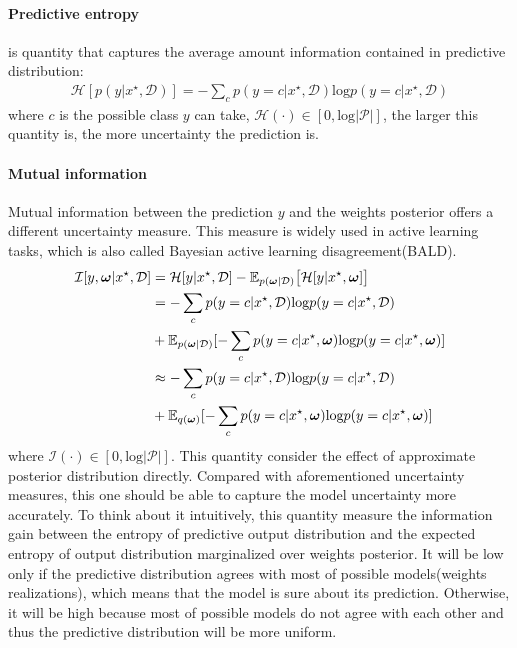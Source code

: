 \paragraph{Predictive entropy} is quantity that captures the average amount information contained in predictive distribution\cite{shannon1948mathematical}: 
\begin{equation}\label{entropy}	
\begin{aligned}
\mathcal H[p(y|x^\star, \mathcal D)] = -\sum_{c}p(y=c|x^\star, \mathcal D)\text{log}p(y=c|x^\star, \mathcal D)
\end{aligned}
\end{equation}
where $c$ is the possible class $y$ can take, $\mathcal H(\cdot) \in [0, \text{log}{|\mathcal P|}]$, the larger this quantity is, the more uncertainty the prediction is.

\paragraph{Mutual information}
Mutual information between the prediction $y$ and the weights posterior offers a different uncertainty measure. This measure is widely used in active learning tasks\cite{houlsby2011bayesian}, which is also called Bayesian active learning disagreement(BALD).
\begin{equation}\label{mi}	
\begin{aligned}
\mathcal I[y,\boldsymbol \omega|x^\star, \mathcal D] &= \mathcal H[y|x^\star, \mathcal D] - \mathbb E_{p(\boldsymbol \omega| \mathcal D)}\big[\mathcal H[y|x^\star, \boldsymbol \omega] \big] \\
&= -\sum_{c}p(y=c|x^\star, \mathcal D)\text{log}p(y=c|x^\star, \mathcal D) \\ &+ \mathbb E_{p(\boldsymbol \omega|\mathcal D)}[-\sum_{c}p(y=c|x^\star, \boldsymbol \omega)\text{log}p(y=c|x^\star, \boldsymbol \omega)] \\
&\approx -\sum_{c}p(y=c|x^\star, \mathcal D)\text{log}p(y=c|x^\star, \mathcal D) \\ &+ \mathbb E_{q(\boldsymbol \omega)}[-\sum_{c}p(y=c|x^\star, \boldsymbol \omega)\text{log}p(y=c|x^\star, \boldsymbol \omega)]
\end{aligned}
\end{equation}
where $\mathcal I(\cdot) \in [0,\text{log}{|\mathcal P|}]$.
This quantity consider the effect of approximate posterior distribution directly. Compared with aforementioned uncertainty measures, this one should be able to capture the model uncertainty more accurately. To think about it intuitively, this quantity measure the information gain between the entropy of predictive output distribution and the expected entropy of output distribution marginalized over weights posterior. It will be low only if the predictive distribution agrees with most of possible models(weights realizations), which means that the model is sure about its prediction. Otherwise, it will be high because most of possible models do not agree with each other and thus the predictive distribution will be more uniform.


